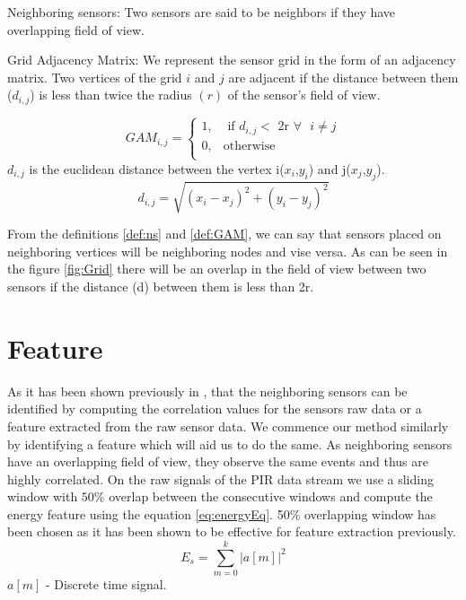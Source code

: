 \begin{definition}{Neighboring sensors:}
 Two sensors are said to be neighbors if they have overlapping field of view.
\label{def:ns}
\end{definition}
\begin{definition}{Grid Adjacency Matrix:}
 We represent the sensor grid in the form of an adjacency matrix. Two vertices of the grid $i$ and $j$ are adjacent if the distance between them ($d_{i,j}$) is less than twice the radius $(r)$ of the sensor's field of view.

\[
GAM_{i,j} = 
\begin{cases}
1, &\text{ if } d_{i,j} < \text{  2r } \forall \text{ } i \ne j\\
0, & \text{otherwise}\\
\end{cases}
    \]
$d_{i,j}$  is the euclidean distance between the vertex i($x_i$,$y_i$) and j($x_j$,$y_j$).
\begin{equation*}
d_{i,j}=\sqrt{(x_i-x_j)^2 + (y_i-y_j)^2}
\end{equation*}
\label{def:GAM}
\end{definition}
From the definitions \ref{def:ns} and \ref{def:GAM}, we can say that sensors placed on neighboring vertices will be neighboring nodes and vise versa. As can be seen in the figure \ref{fig:Grid} there will be an overlap in the field of view between two sensors if the distance (d) between them is less than 2r.

\section{Feature}
As it has been shown previously in \cite{Hong:2013:TAS:2528282.2528302,doi:10.1061/9780784413616.226,Koc:2014:CLC:2674061.2674075}, that the neighboring sensors can be identified by computing the correlation values for the sensors raw data or a feature extracted from the raw sensor data. We commence our method similarly by identifying a feature which will aid us to do the same. As neighboring sensors have an overlapping field of view, they observe the same events and thus are highly correlated. On the raw signals of the PIR data stream we use a sliding window with $50\%$ overlap between the consecutive windows and compute the energy feature using the equation \ref{eq:energyEq}. 50\% overlapping window has been chosen as it has been shown to be effective for feature extraction previously\cite{bao2004activity}.
\begin{equation}
\label{eq:energyEq}
E_s = {\sum_{m=0}^{k}{|a[m]|}^2}
\end{equation}
$a[m]$ - Discrete time signal.

